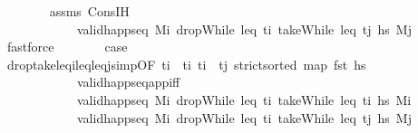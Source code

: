 \begin{isabellebody}
\ \ \ \ \ \ \isamarkupfalse%
\ assms\ Cons{\isachardot}{\kern0pt}IH\isanewline
\ \ \ \ \ \ \ \ \ \ \ \ {\isacartoucheopen}valid{\isacharunderscore}{\kern0pt}happ{\isacharunderscore}{\kern0pt}seq\ M\isactrlsub i{\isacharprime}{\kern0pt}\ {\isacharparenleft}{\kern0pt}dropWhile\ {\isacharparenleft}{\kern0pt}leq\ t\isactrlsub i{\isacharprime}{\kern0pt}{\isacharparenright}{\kern0pt}\ {\isacharparenleft}{\kern0pt}takeWhile\ {\isacharparenleft}{\kern0pt}leq\ t\isactrlsub j{\isacharparenright}{\kern0pt}\ hs\ M\isactrlsub j{\isacartoucheclose}\ \isamarkupfalse%
\ fastforce\isanewline
\ \ \ \ \isamarkupfalse%
\ \isamarkupfalse%
\ {\isacharquery}{\kern0pt}case\ \isanewline
\ \ \ \ \ \ \isamarkupfalse%
\ drop{\isacharunderscore}{\kern0pt}take{\isacharunderscore}{\kern0pt}leq\isactrlsub i{\isacharunderscore}{\kern0pt}leq{\isacharunderscore}{\kern0pt}leq\isactrlsub j{\isacharunderscore}{\kern0pt}simp{\isacharbrackleft}{\kern0pt}OF\ {\isacartoucheopen}t\isactrlsub i\ {\isasymle}\ t\isactrlsub i{\isacharprime}{\kern0pt}{\isacartoucheclose}\ {\isacartoucheopen}t\isactrlsub i{\isacharprime}{\kern0pt}\ {\isasymle}\ t\isactrlsub j{\isacartoucheclose}\ {\isacartoucheopen}strict{\isacharunderscore}{\kern0pt}sorted\ {\isacharparenleft}{\kern0pt}map\ fst\ hs\isanewline
\ \ \ \ \ \ \ \ \ \ \ \ valid{\isacharunderscore}{\kern0pt}happ{\isacharunderscore}{\kern0pt}seq{\isacharunderscore}{\kern0pt}app{\isacharunderscore}{\kern0pt}iff\isanewline
\ \ \ \ \ \ \ \ \ \ \ \ {\isacartoucheopen}valid{\isacharunderscore}{\kern0pt}happ{\isacharunderscore}{\kern0pt}seq\ M\isactrlsub i\ {\isacharparenleft}{\kern0pt}dropWhile\ {\isacharparenleft}{\kern0pt}leq\ t\isactrlsub i{\isacharparenright}{\kern0pt}\ {\isacharparenleft}{\kern0pt}takeWhile\ {\isacharparenleft}{\kern0pt}leq\ t\isactrlsub i{\isacharprime}{\kern0pt}{\isacharparenright}{\kern0pt}\ hs\ M\isactrlsub i{\isacharprime}{\kern0pt}{\isacartoucheclose}\isanewline
\ \ \ \ \ \ \ \ \ \ \ \ {\isacartoucheopen}valid{\isacharunderscore}{\kern0pt}happ{\isacharunderscore}{\kern0pt}seq\ M\isactrlsub i{\isacharprime}{\kern0pt}\ {\isacharparenleft}{\kern0pt}dropWhile\ {\isacharparenleft}{\kern0pt}leq\ t\isactrlsub i{\isacharprime}{\kern0pt}{\isacharparenright}{\kern0pt}\ {\isacharparenleft}{\kern0pt}takeWhile\ {\isacharparenleft}{\kern0pt}leq\ t\isactrlsub j{\isacharparenright}{\kern0pt}\ hs\ M\isactrlsub j{\isacartoucheclose}\isanewline

\end{isabellebody}
